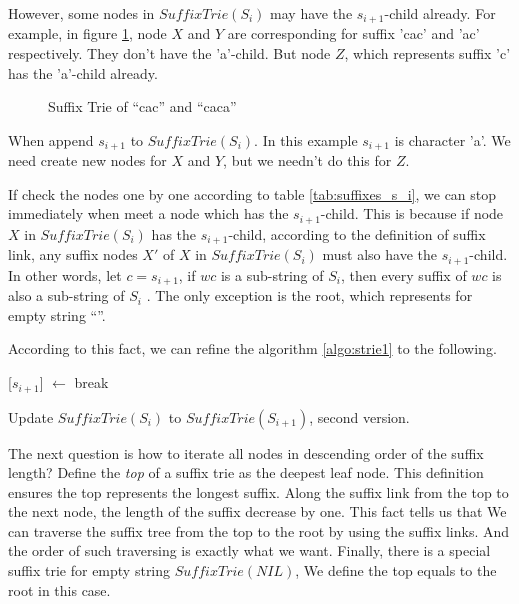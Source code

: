 \documentclass[UTF8]{article}
\begin{document}
However, some nodes in $SuffixTrie(S_i)$ may have the $s_{i+1}$-child already.
For example, in figure \ref{fig:strie-cac}, node $X$ and $Y$ are corresponding
for suffix 'cac' and 'ac' respectively. They don't have the 'a'-child.
But node $Z$, which represents suffix 'c' has the 'a'-child already.

\begin{figure}[htbp]
  \centering
  \caption{Suffix Trie of ``cac'' and ``caca''}
  \label{fig:strie-cac}
\end{figure}

When append $s_{i+1}$ to $SuffixTrie(S_i)$. In this example $s_{i+1}$ is character 'a'.
We need create new nodes for $X$ and $Y$, but we needn't do this
for $Z$.

If check the nodes one by one according to table \ref{tab:suffixes_s_i}, we can
stop immediately when meet a node which has the $s_{i+1}$-child. This is because
if node $X$ in $SuffixTrie(S_i)$ has the $s_{i+1}$-child, according to the
definition of suffix link, any suffix nodes $X'$ of $X$ in $SuffixTrie(S_i)$ must
also have the $s_{i+1}$-child. In other words, let $c=s_{i+1}$, if $wc$ is a sub-string
of $S_i$, then every suffix of $wc$ is also a sub-string of $S_i$ \cite{ukkonen95}.
The only exception is the root, which represents for empty string ``''.

According to this fact, we can refine the algorithm \ref{algo:strie1} to
the following.

\begin{algorithm}
  \begin{algorithmic}[1]
      \State {}[$s_{i+1}$] $\gets$ 
    \Else
      \State break
    \EndIf
  \EndFor
  \end{algorithmic}
  \caption{Update $SuffixTrie(S_i)$ to $SuffixTrie(S_{i+1})$, second version.}
  \label{algo:strie2}
\end{algorithm}

The next question is how to iterate all nodes
in descending order of the suffix length? Define the {\em top} of a suffix
trie as the deepest leaf node. This definition ensures the top represents
the longest suffix. Along the suffix link from the top to the next node,
the length of the suffix decrease by one. This fact tells us that
We can traverse the suffix tree from the top
to the root by using the suffix links. And the order of such traversing
is exactly what we want.
Finally, there is a special suffix trie for empty string $SuffixTrie(NIL)$,
We define the top equals to the root in this case.
\end{document}
